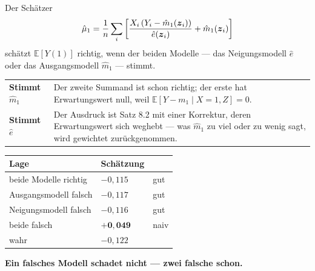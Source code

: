 \begin{merksatz}
Der Schätzer
\[ \hat\mu_1 = \frac1n\sum_i \left[\frac{X_i\,(Y_i - \hat m_1(\boldsymbol{z}_i))}{\hat e(\boldsymbol{z}_i)} + \hat m_1(\boldsymbol{z}_i)\right] \]
schätzt $\mathbb{E}[Y(1)]$ richtig, wenn  der beiden Modelle --- das Neigungsmodell $\hat e$ oder das Ausgangsmodell $\hat m_1$ --- stimmt.

\begin{center}
{\small
\renewcommand{\arraystretch}{1.52}
\begin{tabular}{@{}P{2.8cm}P{5.8cm}@{}}
\toprule
\textbf{Stimmt $\hat m_1$} & Der zweite Summand ist schon richtig; der erste hat Erwartungswert null, weil $\mathbb{E}[Y - m_1 \mid X{=}1,Z] = 0$.\\
\textbf{Stimmt $\hat e$} & Der Ausdruck ist Satz 8.2 mit einer Korrektur, deren Erwartungswert sich weghebt --- was $\hat m_1$ zu viel oder zu wenig sagt, wird gewichtet zurückgenommen.\\
\bottomrule
\end{tabular}}
\end{center}

\begin{center}
{\small
\renewcommand{\arraystretch}{1.5}
\begin{tabular}{@{}P{3.4cm}P{2.2cm}P{2.2cm}@{}}
\toprule
\textbf{Lage} & \textbf{Schätzung} & \\
\midrule
beide Modelle richtig & $-0{,}115$ & \textcolor{gruen}{gut}\\
Ausgangsmodell falsch & $-0{,}117$ & \textcolor{gruen}{gut}\\
Neigungsmodell falsch & $-0{,}116$ & \textcolor{gruen}{gut}\\
beide falsch & $\mathbf{+0{,}049}$ & \textcolor{akzent}{naiv}\\
\midrule
wahr & $-0{,}122$ & \\
\bottomrule
\end{tabular}}
\end{center}

\begin{center}
\begin{minipage}{0.9\textwidth}
\textbf{Ein falsches Modell schadet nicht --- zwei falsche schon.}
\end{minipage}
\end{center}

\begin{center}
\begin{minipage}{0.88\textwidth}
\end{minipage}
\end{center}
\end{merksatz}

